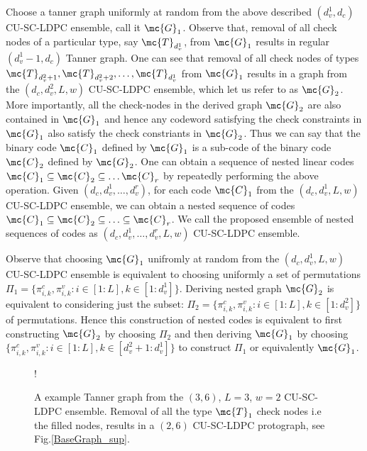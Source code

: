 \documentclass[journal]{IEEEtran}
\begin{document}
Choose a tanner graph uniformly at random from the above described $(d_{v}^{1},d_{c})$ CU-SC-LDPC ensemble, call it $\mc{G}_{1}$. Observe that, removal of all check nodes of a particular type, say $\mc{T}_{d_{v}^{1}}$, from $\mc{G}_{1}$ results in regular $(d_{v}^{1}-1,d_{c})$ Tanner graph. One can see that removal of all check nodes of types $\mc{T}_{d_{v}^{2}+1},\mc{T}_{d_{v}^{2}+2},\ldots, \mc{T}_{d_{v}^1} $ from $\mc{G}_{1}$ results in a graph from the $(d_{c},d_{v}^{2},L,w)$ CU-SC-LDPC ensemble, which let us refer to as $\mc{G}_{2}$. More importantly, all the check-nodes in the derived graph $\mc{G}_{2}$ are also contained in $\mc{G}_{1}$ and hence any codeword satisfying the check constraints in $\mc{G}_{1}$ also satisfy the check constriants in $\mc{G}_{2}$. Thus we can say that the binary code $\mc{C}_{1}$ defined by $\mc{G}_{1}$ is a sub-code of the binary code $\mc{C}_{2}$ defined by $\mc{G}_{2}$. One can obtain a sequence of nested linear codes $\mc{C}_1\subseteq\mc{C}_2\subseteq\ldots\mc{C}_r$ by	 repeatedly performing the above operation. Given $(d_{c},d_{v}^{1},\ldots,d_{v}^{r})$, for each code $\mc{C}_{1}$ from the $(d_{c},d_{v}^{1},L,w)$ CU-SC-LDPC ensemble, we can obtain a nested sequence of codes $\mc{C}_1\subseteq\mc{C}_2\subseteq\ldots\subseteq\mc{C}_r$.  We call the proposed ensemble of nested sequences of codes as $(d_{c},d_{v}^{1},\ldots,d_{v}^{r},L,w)$ CU-SC-LDPC ensemble. 

\begin{Remark}\label{Rmk:EquivNestedConstr1}
Observe that choosing $\mc{G}_{1}$ unifromly at random from the $(d_{c},d_{v}^{1},L,w)$ CU-SC-LDPC ensemble is equivalent to choosing uniformly a set of permutations $\Pi_{1}=\{\pi_{i,k}^{c},\pi_{i,k}^{v}: i\in[1:L],k\in[1:d_{v}^{1}]\}$. Deriving nested graph $\mc{G}_{2}$ is equivalent to considering just the subset: $\Pi_{2}=\{\pi_{i,k}^{c},\pi_{i,k}^{v}: i\in[1:L],k\in[1:d_{v}^{2}]\}$ of permutations. Hence this construction of nested codes is equivalent to first constructing $\mc{G}_{2}$ by choosing $\Pi_{2}$ and then deriving $\mc{G}_{1}$ by choosing $\{\pi_{i,k}^{c},\pi_{i,k}^{v}: i\in[1:L], k\in[d_{v}^{2}+1:d_{v}^{1}]\}$ to construct $\Pi_{1}$ or equivalently $\mc{G}_{1}$.
\end{Remark}

\begin{figure}[t]
\centering
\resizebox {\columnwidth} {!} {

}
\caption{A example Tanner graph from the $(3,6)$, $L=3$, $w=2$ CU-SC-LDPC ensemble. Removal of all the type $\mc{T}_{1}$ check nodes i.e the filled nodes, results in a $(2,6)$ CU-SC-LDPC protograph, see Fig.\ref{BaseGraph_sup}. }
\label{Basegraph}
\end{figure}
\end{document}
